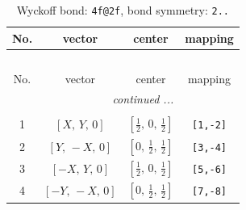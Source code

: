 \documentclass[fleqn,8pt]{jsarticle}
\begin{document}
\renewcommand{\arraystretch}{1.2}
\begin{longtable}{cccc}
\caption{Wyckoff bond: {\tt 4f@2f}, bond symmetry: {\tt 2..}}
 \\
 \hline \hline
No. & vector & center & mapping \\ \hline \endfirsthead

\multicolumn{3}{l}{\tablename\ \thetable{}} \\
 \hline \hline
No. & vector & center & mapping \\ \hline \endhead

 \hline \hline
\multicolumn{3}{r}{\footnotesize\it continued ...} \\ \endfoot

 \hline \hline
\multicolumn{3}{r}{} \\ \endlastfoot

1 & $\left[ X,\, Y,\, 0 \right]$ & $\left[ \frac{1}{2},\, 0,\, \frac{1}{2} \right]$ & {\tt [1,-2]} \\ \hline
2 & $\left[ Y,\, - X,\, 0 \right]$ & $\left[ 0,\, \frac{1}{2},\, \frac{1}{2} \right]$ & {\tt [3,-4]} \\ \hline
3 & $\left[ - X,\, Y,\, 0 \right]$ & $\left[ \frac{1}{2},\, 0,\, \frac{1}{2} \right]$ & {\tt [5,-6]} \\ \hline
4 & $\left[ - Y,\, - X,\, 0 \right]$ & $\left[ 0,\, \frac{1}{2},\, \frac{1}{2} \right]$ & {\tt [7,-8]} \\
\end{longtable}
\renewcommand{\arraystretch}{1.2}
\end{document}
